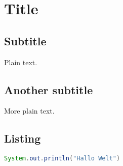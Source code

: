 \documentclass{article}
\begin{document}
\section{Title}
 
\subsection{Subtitle}

Plain text.

\subsection{Another subtitle}

More plain text.

\subsection{Listing}

\begin{lstlisting}[language=Java,frame=shadowbox,rulesepcolor=\color{black}]
	System.out.println("Hallo Welt")
\end{lstlisting}
\end{document}
